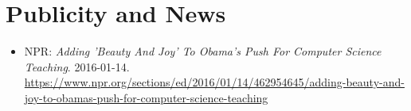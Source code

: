 \section{Publicity and News}

\vspace{6pt}

\begin{itemize}

  \setlength\itemsep{1em}


    \item{NPR: \textit{Adding 'Beauty And Joy' To Obama's Push For Computer Science Teaching}. 2016-01-14.}
    \newline
    \small{\href{https://www.npr.org/sections/ed/2016/01/14/462954645/adding-beauty-and-joy-to-obamas-push-for-computer-science-teaching}{https://www.npr.org/sections/ed/2016/01/14/462954645/adding-beauty-and-joy-to-obamas-push-for-computer-science-teaching}}

\end{itemize}

\vspace{2pt}